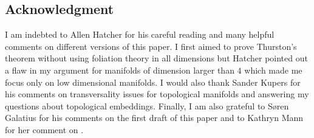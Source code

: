\documentclass[a4paper]{amsart}
\theoremstyle{definition}
\theoremstyle{remark}
\newcommand{\bZ}{\mathbb{Z}}
\newcommand{\hcoker}{/\!\!/}
\newcommand{\tH}{\text{\textnormal{Homeo}}}
\newcommand{\BH}{\mathrm{B}\text{\textnormal{Homeo}}}
\newcommand{\tdH}{\text{Homeo}^{\delta}}
\newcommand{\BdH}{\mathrm{B}\text{\textnormal{Homeo}}^{\delta}}
\numberwithin{equation}{section}
\begin{document}
%
\subsection*{Acknowledgment} I am indebted to Allen Hatcher for his careful  reading and many helpful comments on different versions of this paper. I first aimed to prove Thurston's theorem without using foliation theory in all dimensions but Hatcher pointed out a flaw in my argument for manifolds of dimension larger than $4$ which made me focus only on low dimensional manifolds.  I would also thank Sander Kupers for his comments on  transversality issues for topological manifolds and answering my questions about topological embeddings. Finally, I am also grateful to S\o ren Galatius for his comments on the first draft of this paper and to Kathryn Mann for her comment on .  
\end{document}
